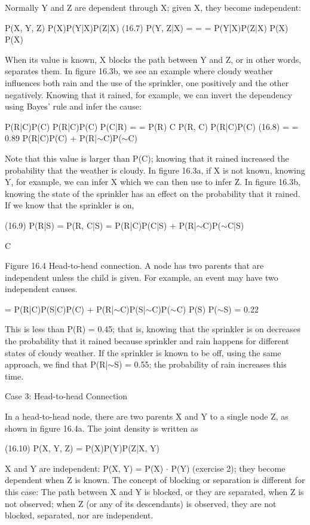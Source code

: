 Normally Y and Z are dependent through X; given X, they become independent:

P(X, Y, Z) P(X)P(Y|X)P(Z|X) (16.7) P(Y, Z|X) = = = P(Y|X)P(Z|X) P(X) P(X)

When its value is known, X blocks the path between Y and Z, or in other words, separates them. In figure 16.3b, we see an example where cloudy weather influences both rain and the use of the sprinkler, one positively and the other negatively. Knowing that it rained, for example, we can invert the dependency using Bayes’ rule and infer the cause:

P(R|C)P(C) P(R|C)P(C) P(C|R) = = P(R) C P(R, C) P(R|C)P(C) (16.8) = = 0.89 P(R|C)P(C) + P(R|$\sim$C)P($\sim$C)

Note that this value is larger than P(C); knowing that it rained increased the probability that the weather is cloudy. In figure 16.3a, if X is not known, knowing Y, for example, we can infer X which we can then use to infer Z. In figure 16.3b, knowing the state of the sprinkler has an effect on the probability that it rained. If we know that the sprinkler is on,

(16.9) P(R|S) = P(R, C|S) = P(R|C)P(C|S) + P(R|$\sim$C)P($\sim$C|S)

C

Figure 16.4 Head-to-head connection. A node has two parents that are independent unless the child is given. For example, an event may have two independent causes.

= P(R|C)P(S|C)P(C) + P(R|$\sim$C)P(S|$\sim$C)P($\sim$C) P(S) P($\sim$S) = 0.22

This is less than P(R) = 0.45; that is, knowing that the sprinkler is on decreases the probability that it rained because sprinkler and rain happens for different states of cloudy weather. If the sprinkler is known to be off, using the same approach, we find that P(R|$\sim$S) = 0.55; the probability of rain increases this time.

Case 3: Head-to-head Connection

In a head-to-head node, there are two parents X and Y to a single node Z, as shown in figure 16.4a. The joint density is written as

(16.10) P(X, Y, Z) = P(X)P(Y)P(Z|X, Y)

X and Y are independent: P(X, Y) = P(X) $\cdot$ P(Y) (exercise 2); they become dependent when Z is known. The concept of blocking or separation is different for this case: The path between X and Y is blocked, or they are separated, when Z is not observed; when Z (or any of its descendants) is observed, they are not blocked, separated, nor are independent.

